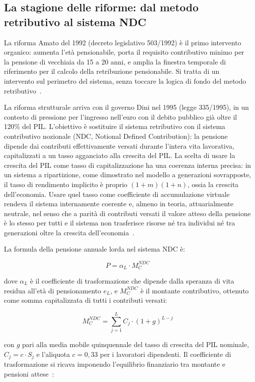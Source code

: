 \subsection{La stagione delle riforme: dal metodo retributivo al sistema NDC}

La riforma Amato del 1992 (decreto legislativo 503/1992) è il primo intervento organico: aumenta l'età pensionabile, porta il requisito contributivo minimo per la pensione di vecchiaia da 15 a 20 anni, e amplia la finestra temporale di riferimento per il calcolo della retribuzione pensionabile. Si tratta di un intervento sul perimetro del sistema, senza toccare la logica di fondo del metodo retributivo~\cite{Bosi2018}.

La riforma strutturale arriva con il governo Dini nel 1995 (legge 335/1995), in un contesto di pressione per l'ingresso nell'euro con il debito pubblico già oltre il 120\% del PIL. L'obiettivo è sostituire il sistema retributivo con il sistema contributivo nozionale (NDC, Notional Defined Contribution): la pensione dipende dai contributi effettivamente versati durante l'intera vita lavorativa, capitalizzati a un tasso agganciato alla crescita del PIL. La scelta di usare la crescita del PIL come tasso di capitalizzazione ha una coerenza interna precisa: in un sistema a ripartizione, come dimostrato nel modello a generazioni sovrapposte, il tasso di rendimento implicito è proprio \((1+m)(1+n)\), ossia la crescita dell'economia. Usare quel tasso come coefficiente di accumulazione virtuale rendeva il sistema internamente coerente e, almeno in teoria, attuarialmente neutrale, nel senso che a parità di contributi versati il valore atteso della pensione è lo stesso per tutti e il sistema non trasferisce risorse né tra individui né tra generazioni oltre la crescita dell'economia~\cite{RosenGayerRapallini2023}.

La formula della pensione annuale lorda nel sistema NDC è:

\[
P = \alpha_L \cdot M_C^{NDC}
\]

dove \(\alpha_L\) è il coefficiente di trasformazione che dipende dalla speranza di vita residua all'età di pensionamento \(e_L\), e \(M_C^{NDC}\) è il montante contributivo, ottenuto come somma capitalizzata di tutti i contributi versati:

\[
M_C^{NDC} = \sum_{j=1}^{L} C_j \cdot (1+g)^{L-j}
\]

con \(g\) pari alla media mobile quinquennale del tasso di crescita del PIL nominale, \(C_j = c \cdot S_j\) e l'aliquota \(c = 0{,}33\) per i lavoratori dipendenti. Il coefficiente di trasformazione si ricava imponendo l'equilibrio finanziario tra montante e pensioni attese~\cite{RosenGayerRapallini2023}:

